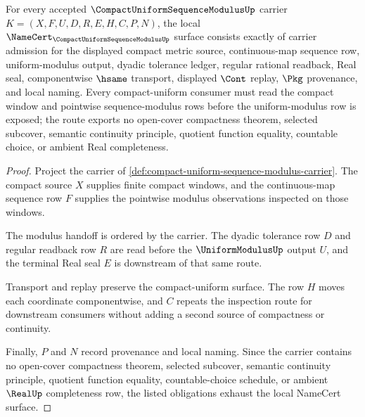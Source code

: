 \begin{theorem}
\label{thm:compact-uniform-sequence-modulus-namecert-obligations}
For every accepted $\CompactUniformSequenceModulusUp$ carrier $K=(X,F,U,D,R,E,H,C,P,N)$, the local $\NameCert_{\CompactUniformSequenceModulusUp}$ surface consists exactly of carrier admission for the displayed compact metric source, continuous-map sequence row, uniform-modulus output, dyadic tolerance ledger, regular rational readback, Real seal, componentwise $\hsame$ transport, displayed $\Cont$ replay, $\Pkg$ provenance, and local naming. Every compact-uniform consumer must read the compact window and pointwise sequence-modulus rows before the uniform-modulus row is exposed; the route exports no open-cover compactness theorem, selected subcover, semantic continuity principle, quotient function equality, countable choice, or ambient Real completeness.
\end{theorem}
\begin{proof}
Project the carrier of \autoref{def:compact-uniform-sequence-modulus-carrier}. The compact source $X$ supplies finite compact windows, and the continuous-map sequence row $F$ supplies the pointwise modulus observations inspected on those windows.

The modulus handoff is ordered by the carrier. The dyadic tolerance row $D$ and regular readback row $R$ are read before the $\UniformModulusUp$ output $U$, and the terminal Real seal $E$ is downstream of that same route.

Transport and replay preserve the compact-uniform surface. The row $H$ moves each coordinate componentwise, and $C$ repeats the inspection route for downstream consumers without adding a second source of compactness or continuity.

Finally, $P$ and $N$ record provenance and local naming. Since the carrier contains no open-cover compactness theorem, selected subcover, semantic continuity principle, quotient function equality, countable-choice schedule, or ambient $\RealUp$ completeness row, the listed obligations exhaust the local NameCert surface.
\end{proof}


